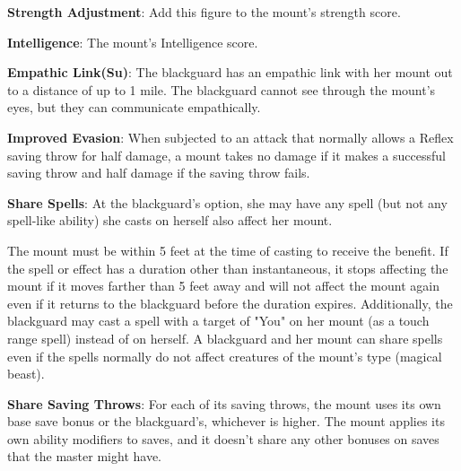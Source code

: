 \textbf{Strength Adjustment}: Add this figure to the mount's strength score.

\textbf{Intelligence}: The mount's Intelligence score.

\textbf{Empathic Link(Su)}: The blackguard has an empathic link with her mount out to a distance of up to 1 mile. The blackguard cannot see through the mount's eyes, but they can communicate empathically.

\textbf{Improved Evasion}: When subjected to an attack that normally allows a Reflex saving throw for half damage, a mount takes no damage if it makes a successful saving throw and half damage if the saving throw fails.

\textbf{Share Spells}: At the blackguard's option, she may have any spell (but not any spell-like ability) she casts on herself also affect her mount.

The mount must be within 5 feet at the time of casting to receive the benefit. If the spell or effect has a duration other than instantaneous, it stops affecting the mount if it moves farther than 5 feet away and will not affect the mount again even if it returns to the blackguard before the duration expires. Additionally, the blackguard may cast a spell with a target of "You" on her mount (as a touch range spell) instead of on herself. A blackguard and her mount can share spells even if the spells normally do not affect creatures of the mount's type (magical beast).

\textbf{Share Saving Throws}: For each of its saving throws, the mount uses its own base save bonus or the blackguard's, whichever is higher. The mount applies its own ability modifiers to saves, and it doesn't share any other bonuses on saves that the master might have.

